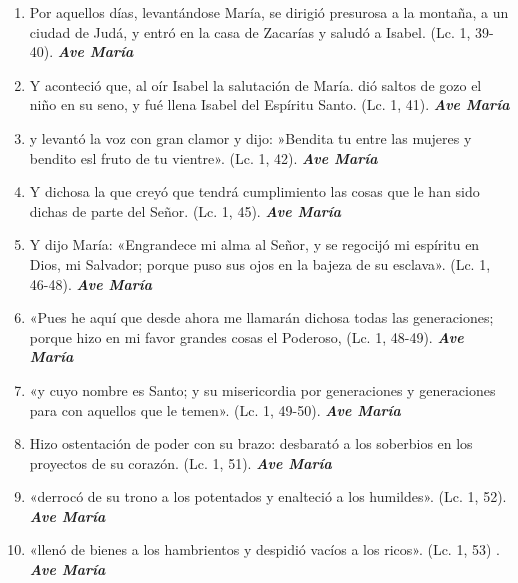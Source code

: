 \documentclass[a4paper,11pt, oneside]{report}
\begin{document}
\begin{enumerate}
  \item Por aquellos días, levantándose María, se dirigió presurosa a la montaña, a un ciudad de Judá, y entró en la casa
  de Zacarías y saludó a Isabel. (Lc. 1, 39-40). \textbf{\textit{Ave María}}

  \item Y aconteció que, al oír Isabel la salutación de María. dió saltos de gozo el niño en su seno, y fué llena Isabel del Espíritu Santo. (Lc. 1, 41). \textbf{\textit{Ave María}}

  \item y levantó la voz con gran clamor y dijo: »Bendita tu entre las mujeres y bendito esl fruto de tu vientre». (Lc. 1, 42). \textbf{\textit{Ave María}}

  \item Y dichosa la que creyó que tendrá cumplimiento las cosas que le han sido dichas de parte del Señor. (Lc. 1, 45). \textbf{\textit{Ave María}}

  \item Y dijo María: «Engrandece mi alma al Señor, y se regocijó mi espíritu en Dios, mi Salvador;
  porque puso sus ojos en la bajeza de su esclava». (Lc. 1, 46-48). \textbf{\textit{Ave María}}

  \item «Pues he aquí que desde ahora me llamarán dichosa todas las generaciones; 
  porque hizo en mi favor grandes cosas el Poderoso, (Lc. 1, 48-49). \textbf{\textit{Ave María}}

  \item «y cuyo nombre es Santo; y su misericordia por generaciones y generaciones para con aquellos que le temen». (Lc. 1, 49-50). \textbf{\textit{Ave María}}

  \item Hizo ostentación de poder con su brazo: desbarató a los soberbios en los proyectos de su corazón. (Lc. 1, 51). \textbf{\textit{Ave María}}

  \item «derrocó de su trono a los potentados y enalteció a los humildes». (Lc. 1, 52). \textbf{\textit{Ave María}}

  \item «llenó de bienes a los hambrientos y despidió vacíos a los ricos». (Lc. 1, 53) . \textbf{\textit{Ave María}}
\end{enumerate}
\end{document}
